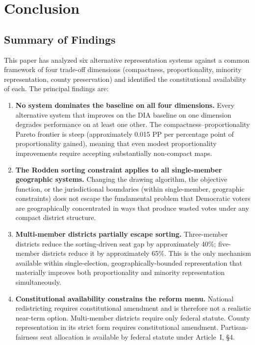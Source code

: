 \section{Conclusion}
\label{sec:conclusion}

\subsection{Summary of Findings}

This paper has analyzed six alternative representation systems against a common
framework of four trade-off dimensions (compactness, proportionality, minority
representation, county preservation) and identified the constitutional
availability of each.  The principal findings are:

\begin{enumerate}
  \item \textbf{No system dominates the baseline on all four dimensions.}
        Every alternative system that improves on the DIA baseline on one
        dimension degrades performance on at least one other.  The
        compactness--proportionality Pareto frontier is steep (approximately
        0.015 PP per percentage point of proportionality gained), meaning that
        even modest proportionality improvements require accepting substantially
        non-compact maps.

  \item \textbf{The Rodden sorting constraint applies to all single-member
        geographic systems.}  Changing the drawing algorithm, the objective
        function, or the jurisdictional boundaries (within single-member,
        geographic constraints) does not escape the fundamental problem that
        Democratic voters are geographically concentrated in ways that produce
        wasted votes under any compact district structure.

  \item \textbf{Multi-member districts partially escape sorting.}
        Three-member districts reduce the sorting-driven seat gap by
        approximately 40\%; five-member districts reduce it by approximately
        65\%.  This is the only mechanism available within single-election,
        geographically-bounded representation that materially improves both
        proportionality and minority representation simultaneously.

  \item \textbf{Constitutional availability constrains the reform menu.}
        National redistricting requires constitutional amendment and is
        therefore not a realistic near-term option.  Multi-member districts
        require only federal statute.  County representation in its strict
        form requires constitutional amendment.  Partisan-fairness seat
        allocation is available by federal statute under Article~I, \S4.

\end{enumerate}


